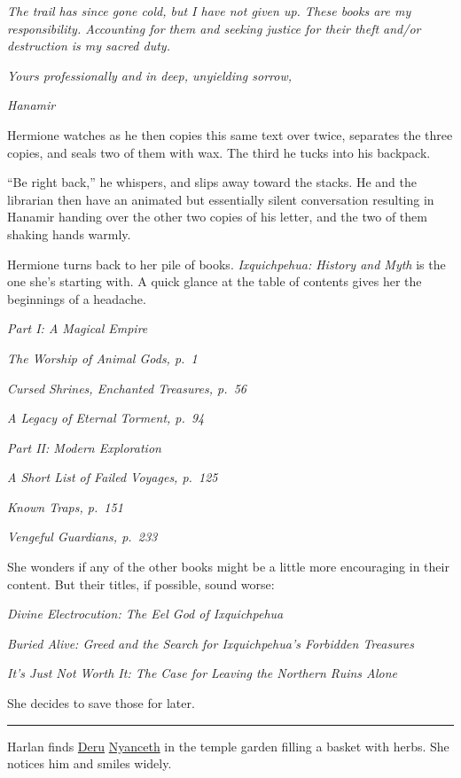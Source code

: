 \documentclass[smalldemyvopaper,11pt,twoside,onecolumn,openright,extrafontsizes]{memoir}
\begin{document}
\emph{The trail has since gone cold, but I have not given up. These
books are my responsibility. Accounting for them and seeking justice for
their theft and/or destruction is my sacred duty.}

\emph{Yours professionally and in deep, unyielding sorrow,}

\emph{Hanamir}

Hermione watches as he then copies this same text over twice, separates
the three copies, and seals two of them with wax. The third he tucks
into his backpack.

``Be right back,'' he whispers, and slips away toward the stacks. He and
the librarian then have an animated but essentially silent conversation
resulting in Hanamir handing over the other two copies of his letter,
and the two of them shaking hands warmly.

Hermione turns back to her pile of books. \emph{Ixquichpehua: History
and Myth} is the one she's starting with. A quick glance at the table of
contents gives her the beginnings of a headache.

\emph{Part I: A Magical Empire}

\emph{The Worship of Animal Gods, p.~1}

\emph{Cursed Shrines, Enchanted Treasures, p.~56}

\emph{A Legacy of Eternal Torment, p.~94}

\emph{Part II: Modern Exploration}

\emph{A Short List of Failed Voyages, p.~125}

\emph{Known Traps, p.~151}

\emph{Vengeful Guardians, p.~233}

She wonders if any of the other books might be a little more encouraging
in their content. But their titles, if possible, sound worse:

\emph{Divine Electrocution: The Eel God of Ixquichpehua}

\emph{Buried Alive: Greed and the Search for Ixquichpehua's Forbidden
Treasures}

\emph{It's Just Not Worth It: The Case for Leaving the Northern Ruins
Alone}

She decides to save those for later.

\begin{center}\rule{0.5\linewidth}{\linethickness}\end{center}

Harlan finds \href{/characters/deru/}{Deru}
\href{/characters/nyanceth/}{Nyanceth} in the temple garden filling a
basket with herbs. She notices him and smiles widely.
\end{document}
